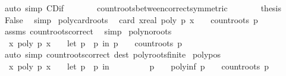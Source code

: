 \begin{isabellebody}
\ {\isacharparenleft}auto\ simp{\isacharcolon}\ CD{\isacharunderscore}if{\isacharparenright}\isanewline
\ \ \ \ \isamarkupfalse%
\ \isamarkupfalse%
\ count{\isacharunderscore}roots{\isacharunderscore}between{\isacharunderscore}correct{\isacharbrackleft}symmetric{\isacharbrackright}\isanewline
\ \ \ \ \isamarkupfalse%
\ \isamarkupfalse%
\ {\isacharquery}thesis\ \isamarkupfalse%
\ False\ \isamarkupfalse%
\ simp\isanewline
{}\isamarkupfalse%
%
\endisatagproof
{\isafoldproof}%
%
\isadelimproof
\isanewline
%
\endisadelimproof
\isanewline
{}\isamarkupfalse%
\ poly{\isacharunderscore}card{\isacharunderscore}roots{\isacharcolon}\isanewline
\ \ {\isachardoublequoteopen}card\ {\isacharbraceleft}x{\isacharcolon}{\isacharcolon}real{\isachardot}\ poly\ p\ x\ {\isacharequal}\ {}{\isacharbraceright}\ {\isacharequal}\ count{\isacharunderscore}roots\ p{\isachardoublequoteclose}\isanewline
%
\isadelimproof
\ \ %
\endisadelimproof
%
\isatagproof
{}\isamarkupfalse%
\ assms\ count{\isacharunderscore}roots{\isacharunderscore}correct\ \isamarkupfalse%
\ simp%
\endisatagproof
{\isafoldproof}%
%
\isadelimproof
\isanewline
%
\endisadelimproof
\isanewline
{}\isamarkupfalse%
\ poly{\isacharunderscore}no{\isacharunderscore}roots{\isacharcolon}\isanewline
\ \ {\isachardoublequoteopen}{\isacharparenleft}{\isasymforall}x{\isachardot}\ poly\ p\ x\ {\isasymnoteq}\ {}{\isacharparenright}\ {\isasymlongleftrightarrow}\ {\isacharparenleft}let\ p\ {\isacharequal}\ p\ in\ p\ {\isasymnoteq}\ {}\ {\isasymand}\ count{\isacharunderscore}roots\ p\ {\isacharequal}\ {}{\isacharparenright}{\isachardoublequoteclose}\isanewline
%
\isadelimproof
\ \ \ \ %
\endisadelimproof
%
\isatagproof
{}\isamarkupfalse%
\ {\isacharparenleft}auto\ simp{\isacharcolon}\ count{\isacharunderscore}roots{\isacharunderscore}correct\ dest{\isacharcolon}\ poly{\isacharunderscore}roots{\isacharunderscore}finite{\isacharparenright}%
\endisatagproof
{\isafoldproof}%
%
\isadelimproof
\isanewline
%
\endisadelimproof
\isanewline
{}\isamarkupfalse%
\ poly{\isacharunderscore}pos{\isacharcolon}\isanewline
\ \ {\isachardoublequoteopen}{\isacharparenleft}{\isasymforall}x{\isachardot}\ poly\ p\ x\ {\isachargreater}\ {}{\isacharparenright}\ {\isasymlongleftrightarrow}\ {\isacharparenleft}let\ p\ {\isacharequal}\ p\ in\ \isanewline
\ \ \ \ \ \ \ \ p\ {\isasymnoteq}\ {}\ {\isasymand}\ poly{\isacharunderscore}inf\ p\ {\isacharequal}\ {}\ {\isasymand}\ count{\isacharunderscore}roots\ p\ {\isacharequal}\ {}{\isacharparenright}{\isachardoublequoteclose}\isanewline

\end{isabellebody}
